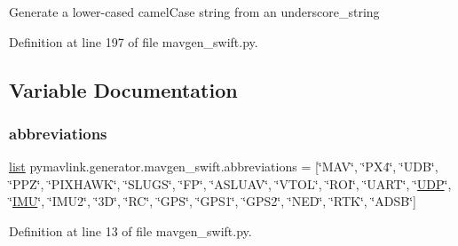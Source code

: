 \begin{DoxyVerb}Generate a lower-cased camelCase string from an underscore_string\end{DoxyVerb}
 

Definition at line 197 of file mavgen\+\_\+swift.\+py.



\subsection{Variable Documentation}
\mbox{\label{namespacepymavlink_1_1generator_1_1mavgen__swift_a7d48550252b4b1e2355d537407feb187}} 
\subsubsection{\texorpdfstring{abbreviations}{abbreviations}}
{\footnotesize\ttfamily \mbox{\hyperlink{structlist}{list}} pymavlink.\+generator.\+mavgen\+\_\+swift.\+abbreviations = \mbox{[}\char`\"{}M\+AV\char`\"{}, \char`\"{}P\+X4\char`\"{}, \char`\"{}U\+DB\char`\"{}, \char`\"{}P\+PZ\char`\"{}, \char`\"{}P\+I\+X\+H\+A\+WK\char`\"{}, \char`\"{}S\+L\+U\+GS\char`\"{}, \char`\"{}FP\char`\"{}, \char`\"{}A\+S\+L\+U\+AV\char`\"{}, \char`\"{}V\+T\+OL\char`\"{}, \char`\"{}R\+OI\char`\"{}, \char`\"{}U\+A\+RT\char`\"{}, \char`\"{}\mbox{\hyperlink{classUDP}{U\+DP}}\char`\"{}, \char`\"{}\mbox{\hyperlink{side__camera__transform_8cpp_af4c1686b93c23e8b4b698c82c66845f4}{I\+MU}}\char`\"{}, \char`\"{}I\+M\+U2\char`\"{}, \char`\"{}3\+D\char`\"{}, \char`\"{}\+R\+C\char`\"{}, \char`\"{}\+G\+P\+S\char`\"{}, \char`\"{}\+G\+P\+S1\char`\"{}, \char`\"{}\+G\+P\+S2\char`\"{}, \char`\"{}\+N\+E\+D\char`\"{}, \char`\"{}\+R\+T\+K\char`\"{}, \char`\"{}\+A\+D\+S\+B\char`\"{}\mbox{]}}



Definition at line 13 of file mavgen\+\_\+swift.\+py.

\mbox{\label{namespacepymavlink_1_1generator_1_1mavgen__swift_a0de31e1282edfda1429e7a1c9a3412fd}} 
